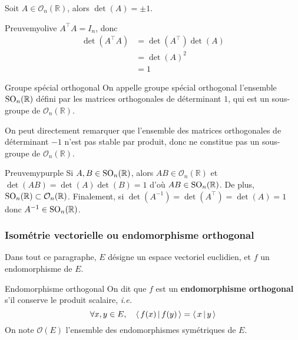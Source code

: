     \begin{prop}{}{}
        Soit $A \in \mathcal{O}_n(\mathbb{R})$, alors $\det(A) = \pm 1$.
    \end{prop}

    \begin{demo}{Preuve}{myolive}
        $A^{\top} A = I_n$, donc 
        \begin{align*}
            \det(A^{\top} A)
            &= \det(A^{\top}) \det(A) \\
            &= \det(A)^2 \\
            &= 1
        \end{align*}
    \end{demo}

    \begin{defitheo}{Groupe spécial orthogonal}{}
        On appelle groupe spécial orthogonal l’ensemble $\operatorname{SO}_n(\mathbb{R})$ défini par les matrices orthogonales de déterminant $1$, qui est un sous-groupe de $\mathcal{O}_n(\mathbb{R})$.
    \end{defitheo}

    On peut directement remarquer que l’ensemble des matrices orthogonales de déterminant $-1$ n’est pas stable par produit, donc ne constitue pas un sous-groupe de $\mathcal{O}_n(\mathbb{R})$.

    \begin{demo}{Preuve}{mypurple}
        Si $A, B \in \operatorname{SO}_n(\mathbb{R})$, alors $AB \in \mathcal{O}_n(\mathbb{R})$ et $\det(AB) = \det(A)\det(B) = 1$ d’où $AB \in \operatorname{SO}_n(\mathbb{R})$. De plus, $\operatorname{SO}_n(\mathbb{R}) \subset \mathcal{O}_n(\mathbb{R})$. Finalement, si $\det(A^{-1}) = \det(A^{\top}) = \det(A) = 1$ donc $A^{-1} \in \operatorname{SO}_n(\mathbb{R})$.
    \end{demo}

    \subsubsection{Isométrie vectorielle ou endomorphisme orthogonal}

    Dans tout ce paragraphe, $E$ désigne un espace vectoriel euclidien, et $f$ un endomorphisme de $E$. 

    \begin{defi}{Endomorphisme orthogonal}{}
        On dit que $f$ est un \textbf{endomorphisme orthogonal} s’il conserve le produit scalaire, \textit{i.e.} 
        \[  \forall x,y \in E, \quad \left<\,f(x)\,\middle|\,f(y)\,\right> = \left<\,x\,\middle|\,y\,\right> \]   
        On note $\mathcal{O}(E)$ l’ensemble des endomorphismes symétriques de $E$.
    \end{defi}

